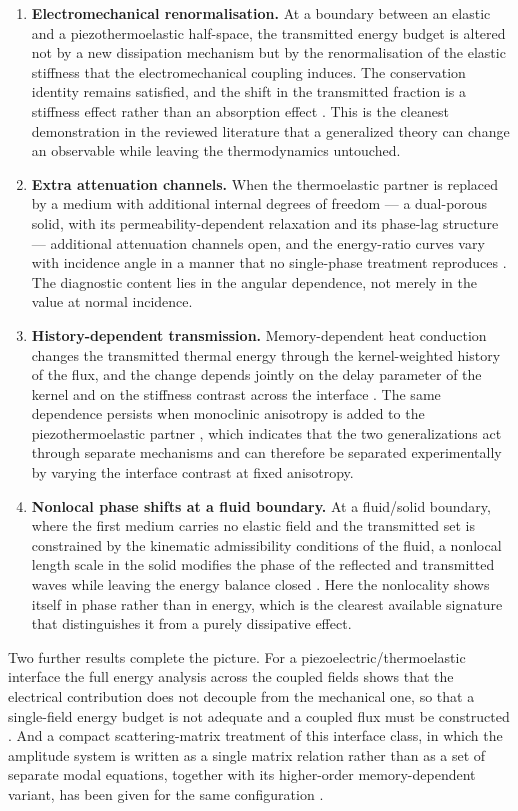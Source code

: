 \begin{enumerate}
\item \textbf{Electromechanical renormalisation.} At a boundary between an elastic and a piezothermoelastic half-space, the transmitted energy budget is altered not by a new dissipation mechanism but by the renormalisation of the elastic stiffness that the electromechanical coupling induces. The conservation identity remains satisfied, and the shift in the transmitted fraction is a stiffness effect rather than an absorption effect \cite{Barak2023IJP}. This is the cleanest demonstration in the reviewed literature that a generalized theory can change an observable while leaving the thermodynamics untouched.
\item \textbf{Extra attenuation channels.} When the thermoelastic partner is replaced by a medium with additional internal degrees of freedom --- a dual-porous solid, with its permeability-dependent relaxation and its phase-lag structure --- additional attenuation channels open, and the energy-ratio curves vary with incidence angle in a manner that no single-phase treatment reproduces \cite{Kumar2023PhysScr}. The diagnostic content lies in the angular dependence, not merely in the value at normal incidence.
\item \textbf{History-dependent transmission.} Memory-dependent heat conduction changes the transmitted thermal energy through the kernel-weighted history of the flux, and the change depends jointly on the delay parameter of the kernel and on the stiffness contrast across the interface \cite{Barak2023MMMS}. The same dependence persists when monoclinic anisotropy is added to the piezothermoelastic partner \cite{Barak2023JTS}, which indicates that the two generalizations act through separate mechanisms and can therefore be separated experimentally by varying the interface contrast at fixed anisotropy.
\item \textbf{Nonlocal phase shifts at a fluid boundary.} At a fluid/solid boundary, where the first medium carries no elastic field and the transmitted set is constrained by the kinematic admissibility conditions of the fluid, a nonlocal length scale in the solid modifies the phase of the reflected and transmitted waves while leaving the energy balance closed \cite{Gupta2023IJNMF}. Here the nonlocality shows itself in phase rather than in energy, which is the clearest available signature that distinguishes it from a purely dissipative effect.
\end{enumerate}

Two further results complete the picture. For a piezoelectric/thermoelastic interface the full energy analysis across the coupled fields shows that the electrical contribution does not decouple from the mechanical one, so that a single-field energy budget is not adequate and a coupled flux must be constructed \cite{Gupta2023Energy}. And a compact scattering-matrix treatment of this interface class, in which the amplitude system is written as a single matrix relation rather than as a set of separate modal equations, together with its higher-order memory-dependent variant, has been given for the same configuration \cite{Barak2023}.

